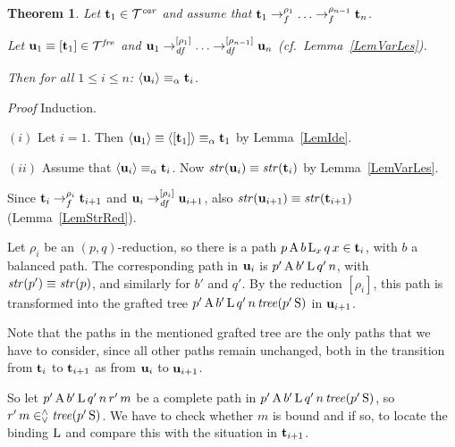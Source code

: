 \documentclass{article}
\theoremstyle{plain}
\newtheorem{The}{Theorem}[section]
\theoremstyle{definition}
\begin{document}
{\begin{The}\label{TheRedSeq} Let ${\bf t}_1 \in {\cal T}^{\it car}$ and assume that ${\bf t}_1 \rightarrow_{f}^{\rho_1}  \ldots \rightarrow_{f}^{\rho_{n-1}} {\bf t}_n$.

Let ${\bf u}_1 \equiv [{\bf t}_1] \in {\cal T}^{\it fre}$ and
${\bf u}_1 \rightarrow_{\it df}^{[\rho_1]} \ldots \rightarrow_{\it df}^{[\rho_{n-1}]} {\bf u}_n$ (cf.\ Lemma~\ref{LemVarLes}).

Then for all $1 \leq i \leq n$: $\langle {\bf u}_i \rangle \equiv_{\alpha} {\bf t}_i$.

\end{The}


{\it Proof\/} Induction.

$(i)$ Let $i = 1$. Then $\langle {\bf u}_1 \rangle \equiv \langle [{\bf t}_1] \rangle \equiv_\alpha {\bf t}_1$ by Lemma~\ref{LemIde}.

$(ii)$ %
Assume that $\langle {\bf u}_i \rangle \equiv_{\alpha} {\bf t}_i$. Now ${\it str}({\bf u}_i) \equiv {\it str}({\bf t}_i)$ by Lemma~\ref{LemVarLes}.

Since ${\bf t}_i \rightarrow_f^{\rho_i} {\bf t}_{i+1}$ and ${\bf u}_i \rightarrow_{\it df}^{[\rho_i]} {\bf u}_{i+1}$, also ${\it str}({\bf u}_{i+1}) \equiv {\it str}({\bf t}_{i+1})$ (Lemma~\ref{LemStrRed}).

Let $\rho_{i}$ be an $(p,q)$-reduction, so there is a path $p \, {\rm A} \, b \, {\rm L}_x \, q \, x \in {\bf t}_i$, with $b$ a balanced path. The corresponding path in ${\bf u}_i$ is $p' \, {\rm A} \, b' \, {\rm L} \, q' \, n$, with ${\it str}(p') \equiv {\it str}(p)$, and similarly for $b'$ and $q'$. By the reduction $[\rho_i]$, this path is transformed into the grafted tree $p' \, {\rm A} \, b' \, {\rm L} \, q' \, n \, {\it tree}(p' \, {\rm S})$ in ${\bf u}_{i+1}$.

Note that the paths in the mentioned grafted tree are the only paths that we have to consider, since all other paths remain unchanged, both in the transition from ${\bf t}_i$ to ${\bf t}_{i+1}$ as from ${\bf u}_i$ to ${\bf u}_{i+1}$.

So let $p' \, {\rm A} \, b' \, {\rm L} \, q' \, n \, r' \, m$ be a complete path in $p' \, {\rm A} \, b' \, {\rm L} \, q' \, n \, {\it tree}(p' \, {\rm S})$, so $r' \, m \in^\wedge_\vee {\it tree}(p' \, {\rm S})$. We have to check whether $m$ is bound and if so, to locate the binding ${\rm L}$ and compare this with the situation in ${\bf t}_{i+1}$.

}
\end{document}

